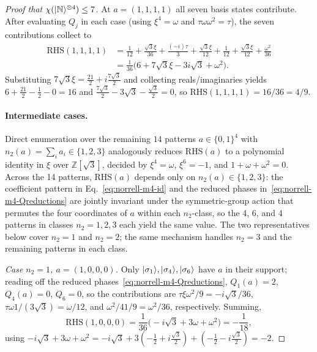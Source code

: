\documentclass[11pt]{article}
\theoremstyle{definition}
\newcommand{\microspace}{\mspace{0.5mu}}
\newcommand{\ket}[1]{\lvert\microspace #1 \microspace \rangle}
\newcommand{\integer}{\mathbb{Z}}
\newcommand{\chiR}{\chi}
\newcommand{\Norrell}{\ket{\mathbb{N}}}
\begin{document}
\begin{proof}[Proof that $\chiR(\Norrell^{\otimes 4}) \le 7$]
		At $a = (1, 1, 1, 1)$ all seven basis states contribute. After
		evaluating $Q_j$ in each case (using $\xi^4 = \omega$ and
		$\tau\omega \omega^2 = \tau$), the seven contributions
		collect to
		\begin{equation}\label{eq:norrell-m4-rhs1}
			\begin{aligned}
				\mathrm{RHS}(1,1,1,1)
				&= \frac{1}{12} + \frac{\sqrt 3 \xi}{36}
				+ \frac{(-i)\tau}{3} + \frac{\sqrt 3 \xi}{12}
				+ \frac{1}{12} + \frac{\sqrt 3 \xi}{12}
				+ \frac{\omega^2}{36} \\
				&= \frac{1}{36} \big( 6 + 7\sqrt 3 \xi - 3 i \sqrt 3 + \omega^2 \big).
			\end{aligned}
		\end{equation}
		Substituting $7\sqrt 3 \xi = \frac{21}{2} + i \frac{7\sqrt 3}{2}$
		and collecting reals/imaginaries yields
		$6 + \frac{21}{2} - \frac{1}{2} - 0 = 16$ and
		$\frac{7\sqrt 3}{2} - 3 \sqrt 3 - \frac{\sqrt 3}{2} = 0$, so
		$\mathrm{RHS}(1,1,1,1) = 16/36 = 4/9$.
		
		\paragraph{Intermediate cases.}
		Direct enumeration over the remaining $14$ patterns
		$a \in \{0, 1\}^4$ with $n_2(a) = \sum_i a_i \in \{1, 2, 3\}$
		analogously reduces $\mathrm{RHS}(a)$ to a polynomial identity in
		$\xi$ over $\integer[\sqrt 3]$, decided by
		$\xi^4 = \omega$, $\xi^6 = -1$, and $1 + \omega + \omega^2 = 0$.
		Across the 14 patterns, $\mathrm{RHS}(a)$ depends only on
		$n_2(a) \in \{1, 2, 3\}$: the coefficient pattern in
		Eq.~\eqref{eq:norrell-m4-id} and the reduced phases
		in~\eqref{eq:norrell-m4-Qreductions} are jointly invariant
		under the symmetric-group action that permutes the four
		coordinates of $a$ within each $n_2$-class, so the 4, 6, and 4
		patterns in classes $n_2 = 1, 2, 3$ each yield the same value.
		The two representatives below cover $n_2 = 1$ and $n_2 = 2$;
		the same mechanism handles $n_2 = 3$ and the remaining
		patterns in each class.
		
		\emph{Case $n_2 = 1$, $a = (1, 0, 0, 0)$.} Only $\ket{\sigma_1}, \ket{\sigma_4},
		\ket{\sigma_6}$ have $a$ in their support; reading off the reduced
		phases~\eqref{eq:norrell-m4-Qreductions},
		$Q_1(a) = 2$, $Q_4(a) = 0$, $Q_6 = 0$, so the contributions are
		$\tau\xi \omega^2 / 9 = -i \sqrt 3 / 36$,
		$\tau\omega 1 / (3 \sqrt 3) = \omega / 12$, and
		$\omega^2 / 4 1 / 9 = \omega^2 / 36$, respectively. Summing,
		\begin{equation}\label{eq:norrell-m4-rhs-n21}
			\mathrm{RHS}(1,0,0,0)
			= \frac{1}{36} \big(- i \sqrt 3 + 3\omega + \omega^2\big)
			= -\frac{1}{18},
		\end{equation}
		using $-i \sqrt 3 + 3\omega + \omega^2 = -i \sqrt 3 +
		3(-\frac{1}{2} + i \frac{\sqrt 3}{2}) +
		(-\frac{1}{2} - i \frac{\sqrt 3}{2}) = -2$.
		

\end{proof}
\end{document}
